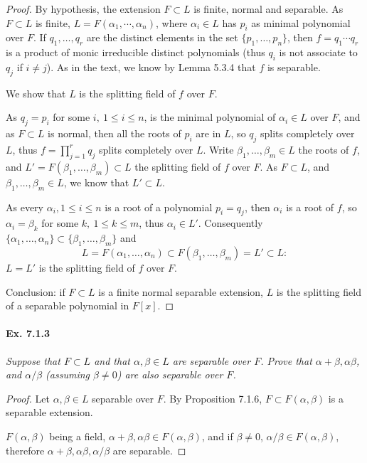 \documentclass[11pt,a4paper]{article}
\begin{document}
\begin{proof}
By hypothesis, the extension $F \subset L$ is finite, normal and separable. As $F \subset L$ is finite,  $L = F(\alpha_1,\cdots,\alpha_n)$, where  $\alpha_i \in L$ has  $p_i$ as minimal polynomial over $F$. If $q_1,\ldots,q_r$ are the distinct elements in the set $\{p_1,\ldots,p_n\}$, then  $f = q_1\cdots q_r$ is a product of monic irreducible distinct polynomials (thus $q_i$ is not associate to $q_j$ if $i\ne j$). As in the text, we know by Lemma 5.3.4 that $f$ is separable.

We show that $L$ is the splitting field of $f$ over $F$.

As $q_j = p_i$ for some $i,\ 1\leq i \leq n$, is the minimal polynomial of $\alpha_i \in L$ over $F$, and as $F \subset L$ is normal, then  all the roots of $p_i$ are in $L$, so $q_j$ splits completely over $L$, thus $f =\prod_{j=1}^r q_j$ splits completely over $L$. Write $\beta_1,\ldots,\beta_m \in L$ the roots of $f$, and $L'=F(\beta_1,\ldots,\beta_m) \subset L$ the splitting  field of $f$ over $F$. As $F \subset L$, and $\beta_1,\ldots,\beta_m \in L$, we know that $L' \subset L$.

As every $\alpha_i,1\leq i \leq n$ is a root of a polynomial $p_i = q_j$, then $\alpha_i$ is a root of $f$, so $\alpha_i = \beta_k$ for some $k,\ 1\leq k \leq m$, thus $\alpha_i \in L'$. Consequently $\{\alpha_1,\ldots,\alpha_n\}\subset \{\beta_1,\ldots,\beta_m\}$ and 
$$L = F(\alpha_1,\ldots,\alpha_n) \subset F(\beta_1,\ldots,\beta_m) = L' \subset  L :$$
$L=L'$ is the splitting field of $f$ over $F$.

Conclusion: if $F\subset L$ is a finite normal separable extension, $L$ is the splitting field of a separable polynomial in $F[x]$.
\end{proof}

\paragraph{Ex. 7.1.3}

{\it Suppose that $F \subset L$ and that $\alpha, \beta \in L$ are separable over $F$. Prove that $\alpha + \beta, \alpha \beta$, and $\alpha/\beta$ (assuming $\beta \ne 0$) are also separable over $F$.
}

\begin{proof}

Let $\alpha,\beta \in L$ separable over $F$. By Proposition 7.1.6, $F \subset F(\alpha,\beta)$ is a separable extension.

$F(\alpha,\beta)$ being a field,  $\alpha + \beta,\alpha \beta \in F(\alpha,\beta)$, and if $\beta \neq 0$, $\alpha/\beta \in F(\alpha,\beta)$, therefore $\alpha + \beta, \alpha \beta, \alpha/\beta$ are separable.
\end{proof}
\end{document}
